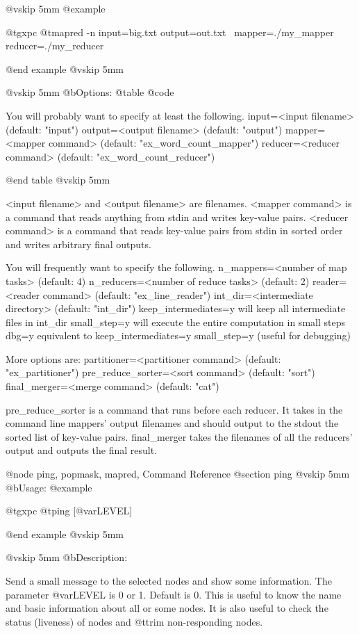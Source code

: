 @vskip 5mm
@example

  @t{gxpc} @t{mapred} -n input=big.txt output=out.txt \
    mapper=./my_mapper reducer=./my_reducer

@end example
@vskip 5mm

@vskip 5mm
@b{Options:}
@table @code

You will probably want to specify at least the following.
  input=<input filename>     (default: "input")
  output=<output filename>   (default: "output")
  mapper=<mapper command>    (default: "ex_word_count_mapper")
  reducer=<reducer command>  (default: "ex_word_count_reducer")

@end table
@vskip 5mm

<input filename> and <output filename> are filenames.
<mapper command> is a command that reads anything from stdin and 
writes key-value pairs.
<reducer command> is a command that reads key-value pairs from stdin 
in sorted order and writes arbitrary final outputs.

You will frequently want to specify the following.
  n_mappers=<number of map tasks>       (default: 4)
  n_reducers=<number of reduce tasks>   (default: 2)
  reader=<reader command>               (default: "ex_line_reader")
  int_dir=<intermediate directory>      (default: "int_dir")
  keep_intermediates=y  will keep all intermediate files in int_dir
  small_step=y  will execute the entire computation in small steps
  dbg=y   equivalent to keep_intermediates=y small_step=y (useful for debugging)

More options are:
  partitioner=<partitioner command>  (default: "ex_partitioner")
  pre_reduce_sorter=<sort command>   (default: "sort")
  final_merger=<merge command>       (default: "cat")

pre_reduce_sorter is a command that runs before each reducer.
It takes in the command line mappers' output filenames and should
output to the stdout the sorted list of key-value pairs.
final_merger takes the filenames of all the reducers' output and
outputs the final result.


@node ping, popmask, mapred, Command Reference
@section ping
@vskip 5mm
@b{Usage:}
@example

  @t{gxpc} @t{ping} [@var{LEVEL}]

@end example
@vskip 5mm

@vskip 5mm
@b{Description:}


  Send a small message to the selected nodes and show some
information. The parameter @var{LEVEL} is 0 or 1. Default is 0.
This is useful to know the name and basic information about
all or some nodes. It is also useful to check the status (liveness)
of nodes and @t{trim} non-responding nodes.

